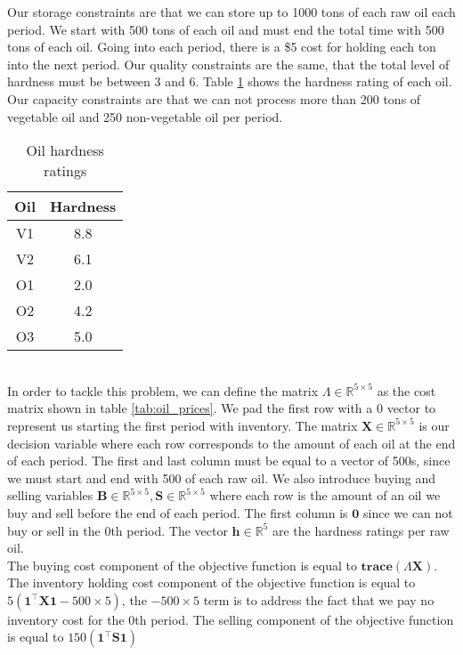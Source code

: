 Our storage constraints are that we can store up to 1000 tons of each raw oil each period. 
We start with 500 tons of each oil and must end the total time with 500 tons of each oil.
Going into each period, there is a \$5 cost for holding each ton into the next period.
Our quality constraints are the same, that the total level of hardness must be between 3 and 6. 
Table \ref{tab:oil_hardness} shows the hardness rating of each oil.
Our capacity constraints are that we can not process more than 200 tons of vegetable oil and 250 non-vegetable oil per period. 
\begin{table}[h!]
\centering
\begin{tabular}{|c|c|}
\hline
Oil & Hardness \\ \hline
V1  & 8.8 \\ \hline
V2  & 6.1 \\ \hline
O1  & 2.0 \\ \hline
O2  & 4.2 \\ \hline
O3  & 5.0 \\ \hline
\end{tabular}
\caption{Oil hardness ratings}
\label{tab:oil_hardness}
\end{table}
\\
In order to tackle this problem, we can define the matrix $\Lambda \in \mathbb{R}^{5 \times 5}$  as the cost matrix shown in table \ref{tab:oil_prices}. 
We pad the first row with a 0 vector to represent us starting the first period with inventory.
The matrix $\textbf{X} \in \mathbb{R}^{5 \times 5}$ is our decision variable where each row corresponds to the amount of each oil at the end of each period. 
The first and last column must be equal to a vector of 500s, since we must start and end with 500 of each raw oil.
We also introduce buying and selling variables $\textbf{B} \in \mathbb{R}^{5 \times 5}, \textbf{S} \in \mathbb{R}^{5 \times 5}$ where each row is the amount of an oil we buy and sell before the end of each period.
The first column is $\textbf{0}$ since we can not buy or sell in the 0th period. 
The vector $\textbf{h} \in \mathbb{R}^5$ are the hardness ratings per raw oil.
\\
The buying cost component of the objective function is equal to $\textbf{trace}(\Lambda \textbf{X})$.
The inventory holding cost component of the objective function is equal to $5 (\textbf{1}^\top \textbf{X} \textbf{1} - 500 \times 5)$, the $-500 \times 5$ term is to address the fact that we pay no inventory cost for the 0th period.
The selling component of the objective function is equal to $150(\textbf{1}^\top \textbf{S} \textbf{1})$

